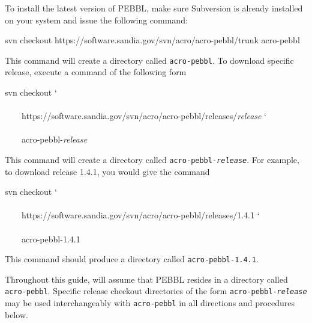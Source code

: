 To install the latest version of PEBBL, make sure Subversion is
already installed on your system and issue the following command:
{\small
\begin{codeblock}
svn checkout https://software.sandia.gov/svn/acro/acro-pebbl/trunk acro-pebbl
\end{codeblock}
}
\noindent This command will create a directory called
\texttt{acro-pebbl}.  
To download specific release, execute a command of the following form
{\small
\begin{codeblock}
svn checkout \char`\\ \\
~~~~https://software.sandia.gov/svn/acro/acro-pebbl/releases/\textit{release}
 \char`\\ \\
~~~~acro-pebbl-\textit{release}
\end{codeblock}
}
\noindent This command will create a directory called
\texttt{acro-pebbl-\textit{release}}. For example, to download release
1.4.1, you would give the command
{\small
\begin{codeblock}
svn checkout \char`\\ \\
~~~~https://software.sandia.gov/svn/acro/acro-pebbl/releases/1.4.1
 \char`\\ \\
~~~~acro-pebbl-1.4.1
\end{codeblock}
}
\noindent This command should produce a directory called
\texttt{acro-pebbl-1.4.1}. 

Throughout this guide, will assume that PEBBL resides in a directory
called \texttt{acro-pebbl}.  Specific release checkout directories of
the form \texttt{acro-pebbl-\textit{release}} may be used
interchangeably with \texttt{acro-pebbl} in all directions and
procedures below.


